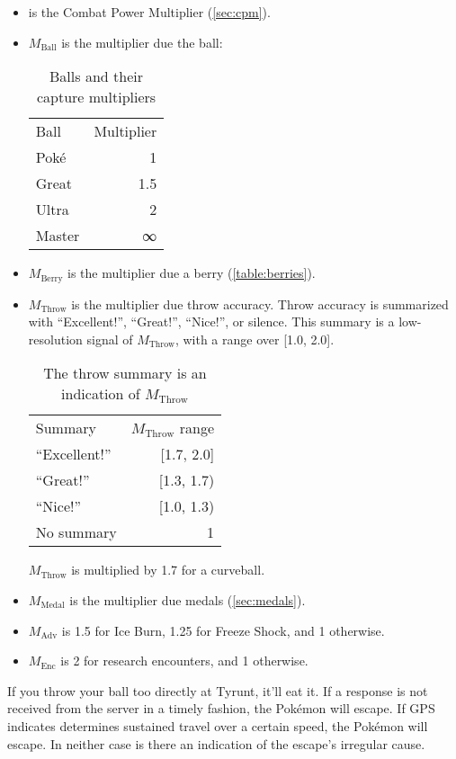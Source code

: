 \begin{itemize}
  \item \CPM{} is the Combat Power Multiplier (\autoref{sec:cpm}).
  \item $M_\mathrm{Ball}$ is the multiplier due the ball:
\begin{table}[h!]
\centering
\begin{tabular}{lr}
Ball & Multiplier\\
\Midrule
Poké & 1\\
Great & 1.5\\
Ultra & 2\\
Master & ∞\\
\end{tabular}
  \caption{Balls and their capture multipliers\label{table:balls}}
\end{table}
\item $M_\mathrm{Berry}$ is the multiplier due a berry (\autoref{table:berries}).
\item $M_\mathrm{Throw}$ is the multiplier due throw accuracy. Throw accuracy is summarized
   with ``Excellent!'', ``Great!'', ``Nice!'', or silence.
    This summary is a low-resolution signal of $M_\mathrm{Throw}$, with a range over [1.0, 2.0].
\begin{table}[h!]
\centering
\begin{tabular}{lr}
Summary & $M_\mathrm{Throw}$ range\\
\Midrule
``Excellent!'' & [1.7, 2.0]\\
``Great!'' & [1.3, 1.7)\\
``Nice!'' & [1.0, 1.3)\\
No summary & 1\\
\end{tabular}
  \caption{The throw summary is an indication of $M_\mathrm{Throw}$\label{table:throw}}
\end{table}
$M_\mathrm{Throw}$ is multiplied by 1.7 for a curveball.
\item $M_\mathrm{Medal}$ is the multiplier due medals (\autoref{sec:medals}).
\item $M_\mathrm{Adv}$ is 1.5 for Ice Burn, 1.25 for Freeze Shock, and 1 otherwise.
\item $M_\mathrm{Enc}$ is 2 for research encounters, and 1 otherwise.
\end{itemize}
If you throw your ball too directly at Tyrunt, it'll eat it.
If a response is not received from the server in a timely fashion, the Pokémon will escape.
If GPS indicates determines sustained travel over a certain speed, the Pokémon will escape.
In neither case is there an indication of the escape's irregular cause.


